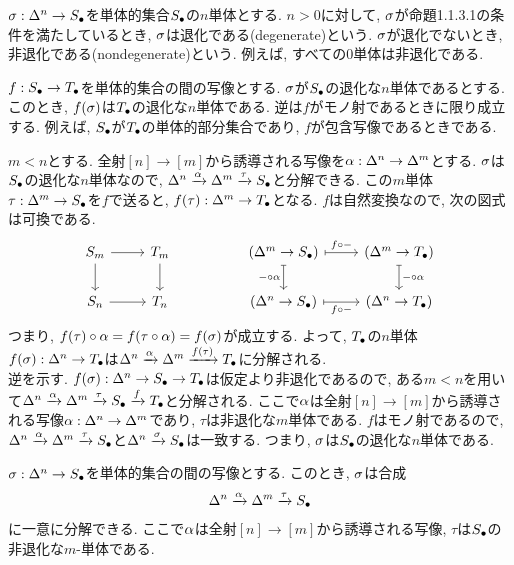 \documentclass[uplatex, a4paper, 14Q, dvipdfmx]{jsreport}
\begin{document}
\begin{definition}
  $\si: \Delta^n \to \S$を単体的集合$\S$の$n$単体とする. 
  $n>0$に対して, $\si$が命題1.1.3.1の条件を満たしているとき, $\si$は退化である(degenerate)という. 
  $\si$が退化でないとき, 非退化である(nondegenerate)という. 
  例えば, すべての$0$単体は非退化である. 
\end{definition}

\begin{remark}
  $f: \S \to \T$を単体的集合の間の写像とする. 
  $\si$が$\S$の退化な$n$単体であるとする. 
  このとき, $f(\si)$は$\T$の退化な$n$単体である. 
  逆は$f$がモノ射であるときに限り成立する. 
  例えば, $\S$が$\T$の単体的部分集合であり, $f$が包含写像であるときである.
\end{remark}

\begin{Proof}
  $m<n$とする. 
  全射$[n] \to [m]$から誘導される写像を$\al: \Delta^n \to \Delta^m$とする. 
  $\si$は$\S$の退化な$n$単体なので, $\Delta^n \xr{\al} \Delta^m \xr{\tau} \S$と分解できる. 
  この$m$単体$\tau: \Delta^m \to \S$を$f$で送ると, $f(\tau): \Delta^m \to \T$となる. 
  $f$は自然変換なので, 次の図式は可換である. 
  \[\begin{tikzcd}
    {S_m} & {T_m} && {(\Delta^m \to \S)} & {(\Delta^m \to \T)} \\
    {S_n} & {T_n} && {(\Delta^n \to \S)} & {(\Delta^n \to \T)}
    \arrow[from=1-1, to=2-1]
    \arrow[from=1-2, to=2-2]
    \arrow[from=2-1, to=2-2]
    \arrow["{- \ci \al}"', maps to, from=1-4, to=2-4]
    \arrow["{f \ci -}", maps to, from=1-4, to=1-5]
    \arrow["{- \ci \al}", maps to, from=1-5, to=2-5]
    \arrow[from=1-1, to=1-2]
    \arrow["{f \ci -}"', maps to, from=2-4, to=2-5]
  \end{tikzcd}\]
  つまり, $f(\tau) \ci \al=f(\tau \ci \al) = f(\si)$が成立する. 
  よって, $\T$の$n$単体$f(\si): \Delta^n \to \T$は$\Delta^n \xr{\al} \Delta^m \xr{f(\tau)} \T$に分解される. \\
  逆を示す. 
  $f(\si): \Delta^n \to \S \to \T$は仮定より非退化であるので, ある$m < n$を用いて$\Delta^n \xr{\al} \Delta^m \xr{\tau} \S \xr{f} \T$と分解される. 
  ここで$\al$は全射$[n] \to [m]$から誘導される写像$\al: \Delta^n \to \Delta^m$であり, $\tau$は非退化な$m$単体である. 
  $f$はモノ射であるので, $\Delta^n \xr{\al} \Delta^m \xr{\tau} \S$と$\Delta^n \xr{\si} \S$は一致する. 
  つまり, $\si$は$\S$の退化な$n$単体である. 
\end{Proof}

\begin{prop}
  $\si: \Delta^n \to \S$を単体的集合の間の写像とする. 
  このとき, $\si$は合成 
  \begin{align*}
    \Delta^n \xr{\al} \Delta^m \xr{\tau} \S
  \end{align*}
  に一意に分解できる. 
  ここで$\al$は全射$[n] \to [m]$から誘導される写像, $\tau$は$\S$の非退化な$m$-単体である. 
\end{prop}
\end{document}
